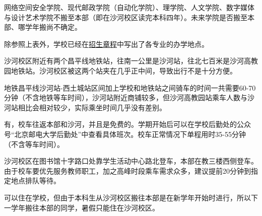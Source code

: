 网络空间安全学院、现代邮政学院（自动化学院）、理学院、人文学院、数字媒体与设计艺术学院不搬至本部（即在沙河校区读完本科四年）。未来学院是否搬至本部、哪学年搬尚不确定。

除参照上表外，学校已经在\href{https://zsb.bupt.edu.cn/info/1005/1992.htm}{招生章程}中写出了各专业的办学地点。


沙河校区附近有两个昌平线地铁站，往南一公里是沙河站，往北七百米是沙河高教园地铁站。沙河校区被这两个站夹在几乎正中间，导致出行不是十分方便。

地铁昌平线沙河站-西土城站区间加上学校和地铁站之间骑车的时间一共需要60-70分钟（不含地铁等车时间），沙河站附近商铺较多，但沙河高教园站乘车人数与沙河站相比会相对较少，实际乘坐时间几乎没有差别。


有，校车往返本部和沙河，并且是免费的。学期开始后可以在学校后勤处的公众号“北京邮电大学后勤处”中查看具体班次。校车正常情况下单程用时35-55分钟（不含等车时间）。

沙河校区在图书馆十字路口处靠学生活动中心路北登车，本部在教三楼西侧登车。由于校车要优先服务教师职工，加之高峰时段乘车需求众多，建议提前20分钟到指定地点排队等待。


可以住在学校，但由于本科生从沙河校区搬往本部是在新学年开始时进行，所以下一学年搬往本部的同学，暑假只能住在沙河校区。
